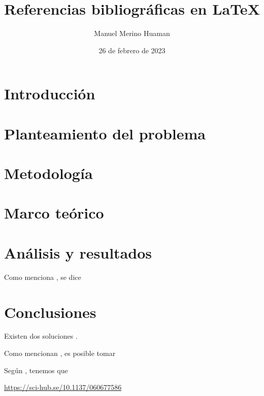 \documentclass[a4paper, 11pt]{article}
\author{Manuel Merino Huaman}
\title{Referencias bibliográficas en \LaTeX}
\date{26 de febrero de 2023}
\begin{document}
    \maketitle

    \section{Introducción}
        \lipsum 

        
    \section{Planteamiento del problema}
        \lipsum[2] \lipsum[4]  

        
    \section{Metodología}
        \lipsum[3] \lipsum[7] 

    \section{Marco teórico}
        \lipsum[5] \lipsum[9] 

        
    \section{Análisis y resultados}
        \lipsum[3] \lipsum[5]

        Como menciona \cite{Zorich-2015}, se dice 
        \lipsum[10]
        
    \section{Conclusiones}
        \lipsum[10] Existen dos soluciones \citealp{Zorich-2015}. 
        
        Como mencionan \cite{Merino-2022}, es posible tomar \lipsum[8]

        Según \cite{Kim-2008}, tenemos que 

        \href{https://sci-hub.se/10.1137/060677586}{https://sci-hub.se/10.1137/060677586}

    
        










    
\end{document}
